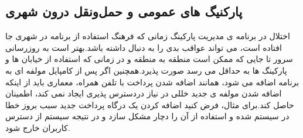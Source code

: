 \subsection{پارکنیگ های عمومی و حمل‌و‌نقل درون شهری}
اختلال در برنامه ی مدیریت پارکینگ زمانی که فرهنگ استفاده از برنامه در شهری جا افتاده است، می تواند عواقب بدی را به دنبال داشته باشد.بهتر است به روزرسانی سرور تا جایی که ممکن است منطقه به منطقه و در زمانی که استفاده از خیابان ها و پارکینگ ها به حداقل می رسد صورت پذیرد.همچنین اگر پس از کامپایل مولفه ای به برنامه اضافه می شود، همانند اضافه شدن پرداخت با تلفن همراه، معماری باید از اینکه اضافه شدن مولفه ی جدید خللی در نیاز دردسترس پذیری ایجاد نمی کند، اطمینان حاصل کند.برای مثال، فرض کنید اضافه کردن یک درگاه پرداخت جدید سبب بروز خطا در سیستم شده و استفاده از آن را دچار مشکل سازد و در نتیجه سیستم از دسترس کاربران خارج شود.
















